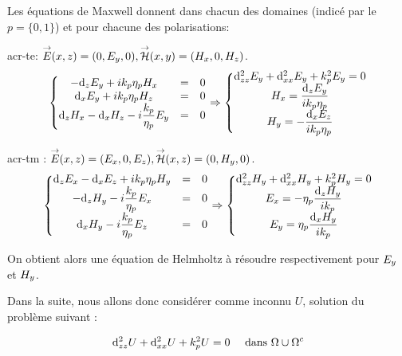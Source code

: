 Les équations de Maxwell donnent dans chacun des domaines (indicé par le $p = \lbrace0,1\rbrace$) et pour chacune des polarisations:

\Gls{acr-te}: $ {\overset{\rightarrow}{E}}({x},{z}) = (0,E_y,0), {\overset{\rightarrow}{\mathcal{H}}}({x},{y}) = (H_x,0,H_z)$. 
\[
\left\lbrace 
\begin{matrix}
-\mathrm{d}_{{z}} E_{y} + i k_p \eta_p H_{x} & = & 0 \\
\mathrm{d}_{{x}} E_{y} + i k_p \eta_p H_{z} &= & 0 \\
\mathrm{d}_{{z}} H_{x}- \mathrm{d}_{{x}} H_{z} - i\dfrac{k_p}{\eta_p} E_{y} & = & 0\\
\end{matrix}
\right.
\Rightarrow
\left\lbrace
\begin{matrix}
\mathrm{d}_{{z}{z}}^2 E_{y} + \mathrm{d}_{{x}{x}}^2 E_{y} + k_p^2 E_{y} = 0\\
H_{x} = \dfrac{\mathrm{d}_{{z}} E_{y}}{i k_p \eta_p }\\
H_{y} =  -\dfrac{\mathrm{d}_{{x}} E_{z}}{i k_p \eta_p }
\end{matrix}
\right.
\]

\Gls{acr-tm} : $ {\overset{\rightarrow}{E}}({x},{z}) = (E_{x},0,E_{z}), {\overset{\rightarrow}{\mathcal{H}}}({x},{z}) = (0,H_{y},0)$. 
\[
\left\lbrace 
\begin{matrix}
\mathrm{d}_{{z}} E_{x} - \mathrm{d}_{{x}} E_{z} + i k_p \eta_p  H_{y} &= & 0 \\
- \mathrm{d}_{{z}} H_{y} - i\dfrac{k_p}{\eta_p} E_{x} & = & 0\\
\mathrm{d}_{{x}} H_{y} -i\dfrac{k_p}{\eta_p} E_{z} &=&0\\
\end{matrix}
\right.
\Rightarrow
\left\lbrace
\begin{matrix}
\mathrm{d}_{{z}{z}}^2 H_{y} + \mathrm{d}_{{x}{x}}^2 H_{y} + k_p^2 H_{y} = 0\\
E_{x} = -\eta_p\dfrac{\mathrm{d}_{{z}} H_{y}}{i k_p}\\
E_{y} = \eta_p\dfrac{\mathrm{d}_{{x}} H_{y}}{i k_p}
\end{matrix}
\right.
\]

On obtient alors une équation de Helmholtz à résoudre respectivement pour $E_{y}$ et $H_{y}$.

Dans la suite, nous allons donc considérer comme inconnu $U$, solution du problème suivant : 

\begin{equation}
\mathrm{d}_{{z}{z}}^2 U + \mathrm{d}_{{x}{x}}^2 U + k_p^2 U = 0 \quad \text { dans $\Omega\cup\Omega^c$}
\end{equation}


